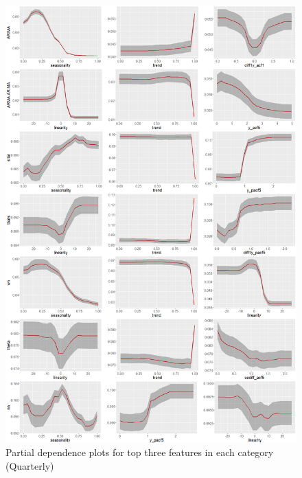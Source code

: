 \documentclass[11pt,a4paper,]{article}
\theoremstyle{definition}
\theoremstyle{definition}
\theoremstyle{definition}
\theoremstyle{remark}
\begin{document}
\begin{figure}
\centering
\includegraphics{figures/pdpquarterly2-1.png}
\caption{\label{fig:pdpquarterly2}Partial dependence plots for top three
features in each category (Quarterly)}
\end{figure}

\newpage
\end{document}
